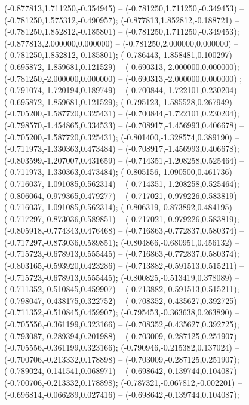  (-0.877813,1.711250,-0.354945) -- (-0.781250,1.711250,-0.349453) -- (-0.781250,1.575312,-0.490957);
 (-0.877813,1.852812,-0.188721) -- (-0.781250,1.852812,-0.185801) -- (-0.781250,1.711250,-0.349453);
 (-0.877813,2.000000,0.000000) -- (-0.781250,2.000000,0.000000) -- (-0.781250,1.852812,-0.185801);
 (-0.786443,-1.858481,0.100297) -- (-0.695872,-1.859681,0.121529) -- (-0.690313,-2.000000,0.000000);
 (-0.781250,-2.000000,0.000000) -- (-0.690313,-2.000000,0.000000) ;
 (-0.791074,-1.720194,0.189749) -- (-0.700844,-1.722101,0.230204) -- (-0.695872,-1.859681,0.121529);
 (-0.795123,-1.585528,0.267949) -- (-0.705200,-1.587720,0.325431) -- (-0.700844,-1.722101,0.230204);
 (-0.798570,-1.454865,0.334533) -- (-0.708917,-1.456993,0.406678) -- (-0.705200,-1.587720,0.325431);
 (-0.801400,-1.328574,0.389190) -- (-0.711973,-1.330363,0.473484) -- (-0.708917,-1.456993,0.406678);
 (-0.803599,-1.207007,0.431659) -- (-0.714351,-1.208258,0.525464) -- (-0.711973,-1.330363,0.473484);
 (-0.805156,-1.090500,0.461736) -- (-0.716037,-1.091085,0.562314) -- (-0.714351,-1.208258,0.525464);
 (-0.806064,-0.979365,0.479277) -- (-0.717021,-0.979226,0.583819) -- (-0.716037,-1.091085,0.562314);
 (-0.806319,-0.873892,0.484195) -- (-0.717297,-0.873036,0.589851) -- (-0.717021,-0.979226,0.583819);
 (-0.805918,-0.774343,0.476468) -- (-0.716863,-0.772837,0.580374) -- (-0.717297,-0.873036,0.589851);
 (-0.804866,-0.680951,0.456132) -- (-0.715723,-0.678913,0.555445) -- (-0.716863,-0.772837,0.580374);
 (-0.803165,-0.593920,0.423286) -- (-0.713882,-0.591513,0.515211) -- (-0.715723,-0.678913,0.555445);
 (-0.800825,-0.513419,0.378089) -- (-0.711352,-0.510845,0.459907) -- (-0.713882,-0.591513,0.515211);
 (-0.798047,-0.438175,0.322752) -- (-0.708352,-0.435627,0.392725) -- (-0.711352,-0.510845,0.459907);
 (-0.795453,-0.363638,0.263890) -- (-0.705556,-0.361199,0.323166) -- (-0.708352,-0.435627,0.392725);
 (-0.793087,-0.289394,0.201988) -- (-0.703009,-0.287125,0.251907) -- (-0.705556,-0.361199,0.323166);
 (-0.790946,-0.215382,0.137024) -- (-0.700706,-0.213332,0.178898) -- (-0.703009,-0.287125,0.251907);
 (-0.789024,-0.141541,0.068971) -- (-0.698642,-0.139744,0.104087) -- (-0.700706,-0.213332,0.178898);
 (-0.787321,-0.067812,-0.002201) -- (-0.696814,-0.066289,0.027416) -- (-0.698642,-0.139744,0.104087);
